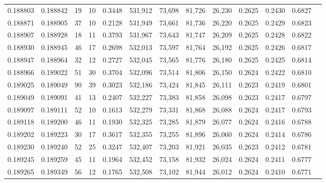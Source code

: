 \begin{tabular}{rrrrrrrrrrrrr}
0.188803 & 0.188842 &    19 &  10 &                                     0.3448 & 531,912 &  73,698 &  81,726 &  26,230 & 0.2625 & 0.2430 & 0.6827 \\
0.188871 & 0.188905 &    37 &  10 &                                     0.2128 & 531,949 &  73,661 &  81,736 &  26,220 & 0.2625 & 0.2429 & 0.6823 \\
0.188907 & 0.188928 &    18 &  11 &                                     0.3793 & 531,967 &  73,643 &  81,747 &  26,209 & 0.2625 & 0.2428 & 0.6822 \\
0.188930 & 0.188945 &    46 &  17 &                                     0.2698 & 532,013 &  73,597 &  81,764 &  26,192 & 0.2625 & 0.2426 & 0.6817 \\
0.188947 & 0.188964 &    32 &  12 &                                     0.2727 & 532,045 &  73,565 &  81,776 &  26,180 & 0.2625 & 0.2425 & 0.6814 \\
0.188966 & 0.189022 &    51 &  30 &                                     0.3704 & 532,096 &  73,514 &  81,806 &  26,150 & 0.2624 & 0.2422 & 0.6810 \\
0.189025 & 0.189049 &    90 &  39 &                                     0.3023 & 532,186 &  73,424 &  81,845 &  26,111 & 0.2623 & 0.2419 & 0.6801 \\
0.189049 & 0.189091 &    41 &  13 &                                     0.2407 & 532,227 &  73,383 &  81,858 &  26,098 & 0.2623 & 0.2417 & 0.6797 \\
0.189097 & 0.189111 &    52 &  10 &                                     0.1613 & 532,279 &  73,331 &  81,868 &  26,088 & 0.2624 & 0.2417 & 0.6793 \\
0.189118 & 0.189200 &    46 &  11 &                                     0.1930 & 532,325 &  73,285 &  81,879 &  26,077 & 0.2624 & 0.2416 & 0.6788 \\
0.189202 & 0.189223 &    30 &  17 &                                     0.3617 & 532,355 &  73,255 &  81,896 &  26,060 & 0.2624 & 0.2414 & 0.6786 \\
0.189230 & 0.189240 &    52 &  25 &                                     0.3247 & 532,407 &  73,203 &  81,921 &  26,035 & 0.2623 & 0.2412 & 0.6781 \\
0.189245 & 0.189259 &    45 &  11 &                                     0.1964 & 532,452 &  73,158 &  81,932 &  26,024 & 0.2624 & 0.2411 & 0.6777 \\
0.189265 & 0.189349 &    56 &  12 &                                     0.1765 & 532,508 &  73,102 &  81,944 &  26,012 & 0.2624 & 0.2410 & 0.6771 \\

\end{tabular}
